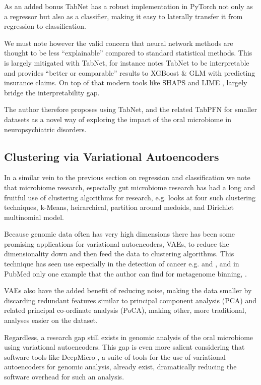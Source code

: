 \documentclass{article}
\begin{document}
\begin{multicols}{2}
As an added bonus TabNet has a robust implementation in PyTorch \cite{noauthor_pytorch-tabnet_nodate} not only as a regressor but also as a classifier, making it easy to laterally transfer it from regression to classification.

We must note however the valid concern that neural network methods are thought to be less ``explainable'' compared to standard statistical methods. This is largely mitigated with TabNet, for instance \cite{MCDONNELL2023119543} notes TabNet to be interpretable and provides ``better or comparable'' results to XGBoost \& GLM with predicting insurance claims. On top of that modern tools like SHAPS \cite{lundberg_unified_2017} and LIME \cite{10.1145/2939672.2939778}, largely bridge the interpretability gap.

The author therefore proposes using TabNet, and the related TabPFN \cite{hollmann2022tabpfn} for smaller datasets as a novel way of exploring the impact of the oral microbiome in neuropsychiatric disorders.
\subsection{Clustering via Variational Autoencoders}
In a similar vein to the previous section on regression and classification we note that microbiome research, especially gut microbiome research has had a long and fruitful use of clustering algorithms for research, e.g. \cite{shi_performance_2022} looks at four such clustering techniques, k-Means, heirarchical, partition around medoids, and Dirichlet multinomial model. 

Because genomic data often has very high dimensions there has been some promising applications for variational autoencoders, VAEs, to reduce the dimensionality down and then feed the data to clustering algorithms. This technique has seen use especially in the detection of cancer e.g. \cite{hira_integrated_2021} and \cite{8983228}, and in PubMed only one example that the author can find for metagenome binning, \cite{nissen_improved_2021}.

 VAEs also have the added benefit of reducing noise, making the data smaller by discarding redundant features similar to principal component analysis (PCA) and related principal co-ordinate analysis (PoCA), making other, more traditional, analyses easier on the dataset. 
 
 Regardless, a research gap still exists in genomic analysis of the oral microbiome using variational autoencoders. This gap is even more salient considering that software tools like DeepMicro \cite{oh_deepmicro_2020}, a suite of tools for the use of variational autoencoders for genomic analysis, already exist, dramatically reducing the software overhead for such an analysis.
 

\end{multicols}
\end{document}
